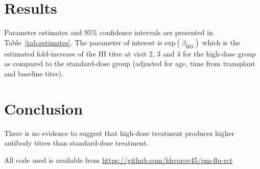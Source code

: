 \documentclass[11pt]{article}
\begin{document}


\section{Results}

Parameter estimates and 95\% confidence intervals
are presented in Table~\ref{tab:estimates}.
The parameter of interest is $\text{exp}(\beta_{\text{HD}})$
which is the estimated
fold-increase of the HI titre at visit 2, 3 and 4 for the high-dose group
as compared to the standard-dose group (adjusted for age, time from transplant
and baseline titre).



\section{Conclusion}

There is no evidence to suggest that high-dose treatment produces
higher antibody
titres than standard-dose treatment.



All code used is available from \url{https://github.com/khvorov45/pm-flu-rct}
\end{document}
